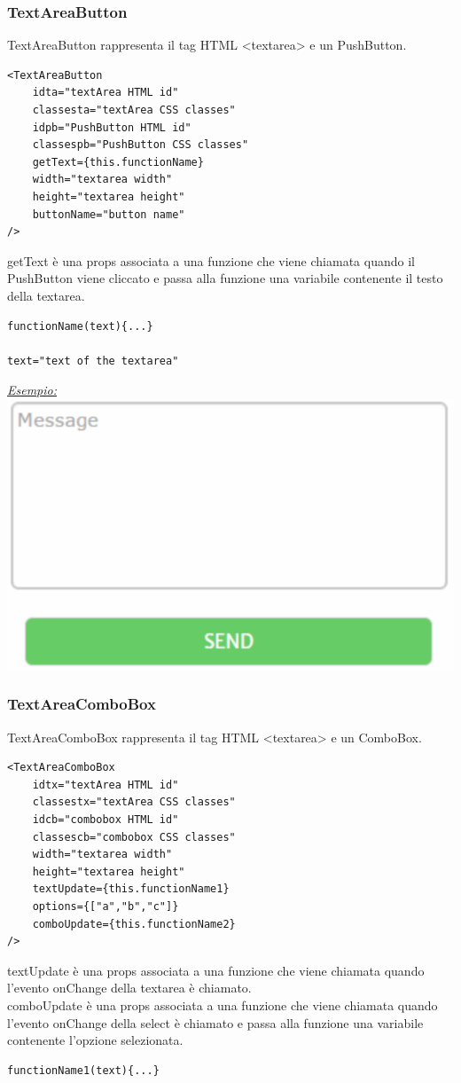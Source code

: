 \begin{flushleft}
\subsubsection{TextAreaButton}

TextAreaButton rappresenta il tag HTML <textarea> e un PushButton.
\begin{verbatim}
<TextAreaButton
	idta="textArea HTML id"
	classesta="textArea CSS classes"
	idpb="PushButton HTML id"
	classespb="PushButton CSS classes"
	getText={this.functionName}
	width="textarea width"
	height="textarea height"
	buttonName="button name"
/>
\end{verbatim}
getText è una props associata a una funzione che viene chiamata quando il PushButton viene cliccato e passa alla funzione una variabile contenente il testo della textarea.
\begin{verbatim}
functionName(text){...}

text="text of the textarea"
\end{verbatim}

\begin{center}
\underline{\textit{Esempio:}}
\\
\includegraphics[scale=0.5]{img/textB.png}
\\
\end{center}

\subsubsection{TextAreaComboBox}
TextAreaComboBox rappresenta il tag HTML <textarea> e un ComboBox.
\begin{verbatim}
<TextAreaComboBox
	idtx="textArea HTML id"
	classestx="textArea CSS classes"
	idcb="combobox HTML id"
	classescb="combobox CSS classes"
	width="textarea width"
	height="textarea height"
	textUpdate={this.functionName1}
	options={["a","b","c"]}
	comboUpdate={this.functionName2}
/>
\end{verbatim}
textUpdate è una props associata a una funzione che viene chiamata quando l'evento onChange della textarea è chiamato.\\
comboUpdate è una props associata a una funzione che viene chiamata quando l'evento onChange della select  è chiamato e passa alla funzione una variabile contenente l'opzione selezionata.
\begin{verbatim}
functionName1(text){...}


\end{verbatim}
\end{flushleft}
